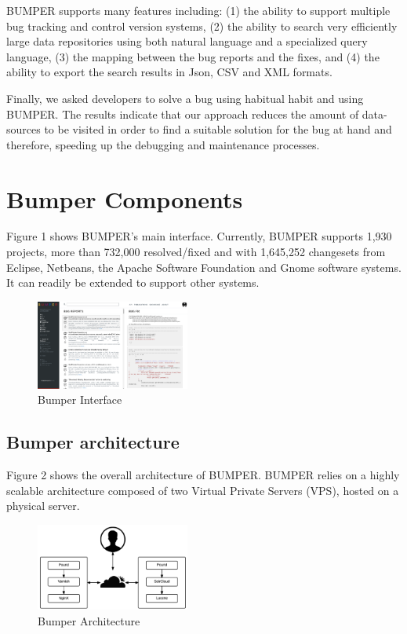\documentclass[conference]{IEEEtran}
\begin{document}
BUMPER supports many features including: (1) the ability to support multiple bug tracking and control version systems, (2) the ability to search very efficiently large data repositories using both natural language and a specialized query language, (3) the mapping between the bug reports and the fixes, and (4) the ability to export the search results in Json, CSV and XML formats.

Finally, we asked developers to solve a bug using habitual habit and using BUMPER. The results indicate that our approach reduces the amount of data-sources to be visited in order to find a suitable solution for the bug at hand and therefore, speeding up the debugging and maintenance processes.

\section{Bumper Components}
\label{sec:Bumper Components}

Figure 1 shows BUMPER’s main interface. Currently, BUMPER supports 1,930 projects, more than 732,000 resolved/fixed and with 1,645,252 changesets from Eclipse, Netbeans, the Apache Software Foundation and Gnome software systems. It can readily be extended to support other systems.


\begin{figure}
  \centering
  \includegraphics[width=0.45\textwidth]{media/interface.png}
  \caption{Bumper Interface}
\end{figure}




\subsection{Bumper architecture}
\label{sub:Bumper architecture}

Figure 2 shows the overall architecture of BUMPER. BUMPER relies on a highly scalable architecture composed of two Virtual Private Servers (VPS), hosted on a physical server.

\begin{figure}
  \centering
  \includegraphics[width=0.45\textwidth]{media/archi.png}
  \caption{Bumper Architecture}
\end{figure}
\end{document}
